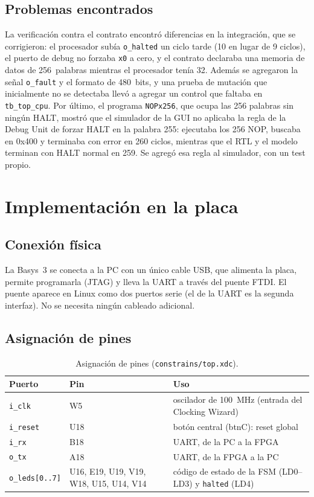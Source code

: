 \documentclass[12pt,a4paper]{article}
\begin{document}
\subsection{Problemas encontrados}

La verificación contra el contrato encontró diferencias en la integración, que
se corrigieron: el procesador subía \texttt{o\_halted} un ciclo tarde (10 en lugar
de 9 ciclos), el puerto de debug no forzaba \texttt{x0} a cero, y el contrato
declaraba una memoria de datos de 256~palabras mientras el procesador tenía 32.
Además se agregaron la señal \texttt{o\_fault} y el formato de 480~bits, y una
prueba de mutación que inicialmente no se detectaba llevó a agregar un control
que faltaba en \texttt{tb\_top\_cpu}. Por último, el programa \texttt{NOPx256},
que ocupa las 256 palabras sin ningún HALT, mostró que el simulador de la GUI no
aplicaba la regla de la Debug Unit de forzar HALT en la palabra 255: ejecutaba
los 256 NOP, buscaba en 0x400 y terminaba con error en 260 ciclos, mientras que
el RTL y el modelo terminan con HALT normal en 259. Se agregó esa regla al
simulador, con un test propio.

\section{Implementación en la placa}

\subsection{Conexión física}

La Basys~3 se conecta a la PC con un único cable USB, que alimenta la placa,
permite programarla (JTAG) y lleva la UART a través del puente FTDI. El puente
aparece en Linux como dos puertos serie (el de la UART es la segunda interfaz).
No se necesita ningún cableado adicional.

\subsection{Asignación de pines}

\begin{table}[H]
\centering
\small
\begin{tabular}{@{}lL{4.2cm}L{6.6cm}@{}}
\toprule
Puerto & Pin & Uso \\
\midrule
\texttt{i\_clk} & W5 & oscilador de 100~MHz (entrada del Clocking Wizard) \\
\texttt{i\_reset} & U18 & botón central (btnC): reset global \\
\texttt{i\_rx} & B18 & UART, de la PC a la FPGA \\
\texttt{o\_tx} & A18 & UART, de la FPGA a la PC \\
\texttt{o\_leds[0..7]} & U16, E19, U19, V19, W18, U15, U14, V14 & código de estado de la FSM (LD0--LD3) y \texttt{halted} (LD4) \\
\bottomrule
\end{tabular}
\caption{Asignación de pines (\texttt{constrains/top.xdc}).}
\end{table}
\end{document}
